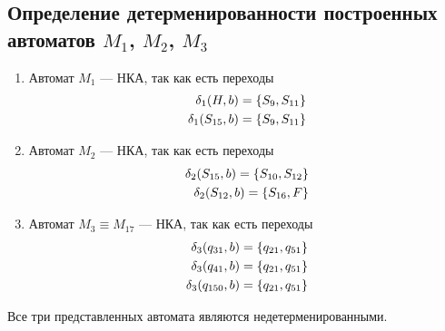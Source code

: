 \subsection{Определение детерменированности построенных автоматов \(M_1\), \(M_2\), \(M_3\)}
\begin{enumerate}
	\item Автомат \(M_1\) --- НКА, так как есть переходы
	      \begin{align*}
		      \delta_1(H,b) = \left\{S_9, S_{11}\right\} \\
		      \delta_1(S_{15},b) = \left\{S_9, S_{11}\right\}
	      \end{align*}
	\item Автомат \(M_2\) --- НКА, так как есть переходы
	      \begin{align*}
		      \delta_2(S_{15}, b) = \left\{S_{10}, S_{12}\right\} \\
		      \delta_2(S_{12}, b) = \left\{S_{16}, F\right\}
	      \end{align*}
	\item Автомат \(M_3 \equiv M_{17}\) --- НКА, так как есть переходы
	      \begin{align*}
		      \delta_3(q_{31}, b) = \left\{q_{21}, q_{51}\right\} \\
		      \delta_3(q_{41}, b) = \left\{q_{21}, q_{51}\right\} \\
		      \delta_3(q_{150}, b) = \left\{q_{21}, q_{51}\right\}
	      \end{align*}
\end{enumerate}
Все три представленных автомата являются недетерменированными.
